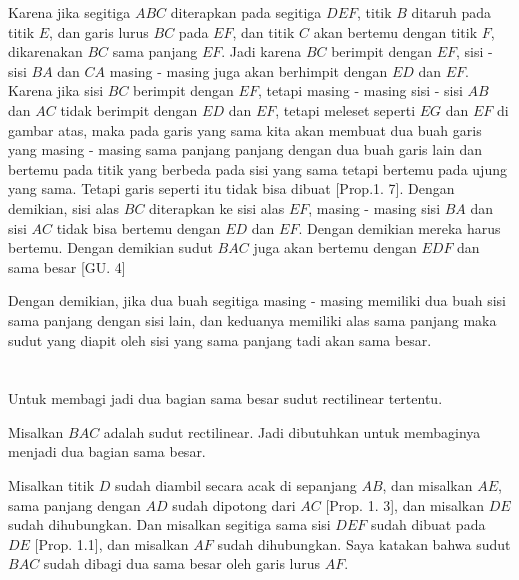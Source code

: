 \documentclass[a4paper]{book}
\begin{document}
Karena jika segitiga $ABC$ diterapkan pada segitiga $DEF$, titik $B$ ditaruh
pada titik $E$, dan garis lurus $BC$ pada $EF$, dan titik $C$ akan bertemu
dengan titik $F$, dikarenakan $BC$ sama panjang $EF$. Jadi karena $BC$
berimpit dengan $EF$, sisi - sisi $BA$ dan $CA$ masing - masing juga akan 
berhimpit dengan $ED$ dan $EF$. Karena jika sisi $BC$  berimpit dengan $EF$, 
tetapi masing - masing sisi - sisi $AB$ dan $AC$  tidak berimpit dengan 
$ED$ dan $EF$, tetapi meleset seperti $EG$ dan $EF$ di gambar atas, maka 
pada garis yang sama kita akan membuat dua buah garis yang masing - masing
sama panjang panjang dengan dua buah garis lain dan bertemu pada titik yang
berbeda pada sisi yang sama tetapi bertemu pada ujung yang sama. Tetapi garis
seperti itu tidak bisa dibuat [Prop.1. 7]. Dengan demikian, sisi alas $BC$ 
diterapkan ke sisi alas $EF$, masing - masing sisi $BA$ dan sisi  $AC$ tidak 
bisa bertemu dengan $ED$ dan $EF$. Dengan demikian mereka harus bertemu.
Dengan demikian sudut $BAC$ juga akan bertemu dengan $EDF$ dan sama besar 
[GU. 4]

Dengan demikian, jika dua buah segitiga masing - masing memiliki dua buah 
sisi sama panjang dengan sisi lain, dan keduanya memiliki alas 
sama panjang maka sudut yang diapit oleh sisi yang sama panjang tadi akan 
sama besar.

\section*{\centering \thesection} 
Untuk membagi jadi dua bagian sama besar sudut rectilinear tertentu.
\begin{center}
\end{center} 

Misalkan $BAC$ adalah sudut rectilinear. Jadi dibutuhkan untuk 
membaginya menjadi dua bagian sama besar.

Misalkan titik $D$ sudah diambil secara acak di sepanjang $AB$, dan misalkan
$AE$, sama panjang dengan $AD$ sudah dipotong dari $AC$ [Prop. 1. 3], dan 
misalkan $DE$ sudah dihubungkan. Dan misalkan segitiga sama sisi $DEF$ sudah
dibuat pada $DE$ [Prop. 1.1], dan misalkan $AF$ sudah dihubungkan. Saya 
katakan bahwa sudut $BAC$ sudah dibagi dua sama besar oleh garis lurus $AF$.
\end{document}
